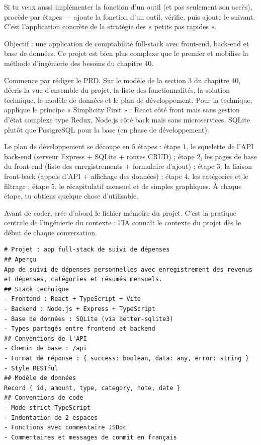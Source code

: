 Si tu veux aussi implémenter la fonction d'un outil (et pas seulement son accès), procède par étapes — ajoute la fonction d'un outil, vérifie, puis ajoute le suivant. C'est l'application concrète de la stratégie des « petits pas rapides ».



Objectif : une application de comptabilité full-stack avec front-end, back-end et base de données. Ce projet est bien plus complexe que le premier et mobilise la méthode d'ingénierie des besoins du chapitre 40.

Commence par rédiger le PRD. Sur le modèle de la section 3 du chapitre 40, décris la vue d'ensemble du projet, la liste des fonctionnalités, la solution technique, le modèle de données et le plan de développement. Pour la technique, applique le principe « Simplicity First » : React côté front mais sans gestion d'état complexe type Redux, Node.js côté back mais sans microservices, SQLite plutôt que PostgreSQL pour la base (en phase de développement).

Le plan de développement se découpe en 5 étapes : étape 1, le squelette de l'API back-end (serveur Express + SQLite + routes CRUD) ; étape 2, les pages de base du front-end (liste des enregistrements + formulaire d'ajout) ; étape 3, la liaison front-back (appels d'API + affichage des données) ; étape 4, les catégories et le filtrage ; étape 5, le récapitulatif mensuel et de simples graphiques. À chaque étape, tu obtiens quelque chose d'utilisable.


Avant de coder, crée d'abord le fichier mémoire du projet. C'est la pratique centrale de l'ingénierie du contexte : l'IA connaît le contexte du projet dès le début de chaque conversation.

\begin{lstlisting}
# Projet : app full-stack de suivi de dépenses
## Aperçu
App de suivi de dépenses personnelles avec enregistrement des revenus et dépenses, catégories et résumés mensuels.
## Stack technique
- Frontend : React + TypeScript + Vite
- Backend : Node.js + Express + TypeScript
- Base de données : SQLite (via better-sqlite3)
- Types partagés entre frontend et backend
## Conventions de l'API
- Chemin de base : /api
- Format de réponse : { success: boolean, data: any, error: string }
- Style RESTful
## Modèle de données
Record { id, amount, type, category, note, date }
## Conventions de code
- Mode strict TypeScript
- Indentation de 2 espaces
- Fonctions avec commentaire JSDoc
- Commentaires et messages de commit en français
\end{lstlisting}

